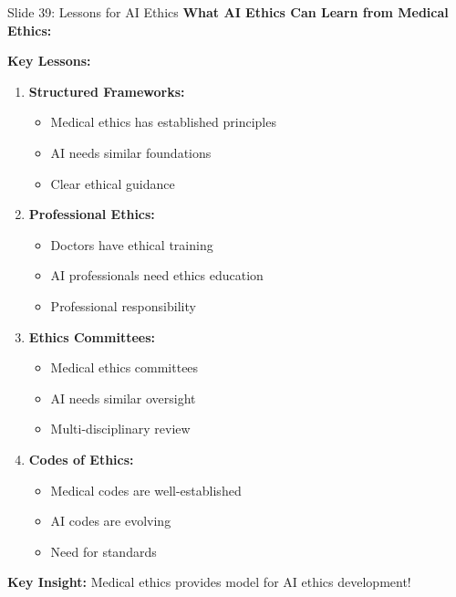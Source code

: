 \documentclass[8pt]{beamer}
\begin{document}
	\begin{frame}{Slide 39: Lessons for AI Ethics}
		\fontsize{6.5}{7.5}\selectfont
		\textbf{What AI Ethics Can Learn from Medical Ethics:}
		
		\vspace{0.1cm}
		\textbf{Key Lessons:}
		\begin{enumerate}
			\item \textbf{Structured Frameworks:}
			\begin{itemize}
				\item Medical ethics has established principles
				\item AI needs similar foundations
				\item Clear ethical guidance
			\end{itemize}
			\item \textbf{Professional Ethics:}
			\begin{itemize}
				\item Doctors have ethical training
				\item AI professionals need ethics education
				\item Professional responsibility
			\end{itemize}
			\item \textbf{Ethics Committees:}
			\begin{itemize}
				\item Medical ethics committees
				\item AI needs similar oversight
				\item Multi-disciplinary review
			\end{itemize}
			\item \textbf{Codes of Ethics:}
			\begin{itemize}
				\item Medical codes are well-established
				\item AI codes are evolving
				\item Need for standards
			\end{itemize}
		\end{enumerate}
		
		\textcolor{myblue}{\textbf{Key Insight:}} Medical ethics provides \textcolor{myblue}{model for AI ethics development}!
	\end{frame}
	
\end{document}
